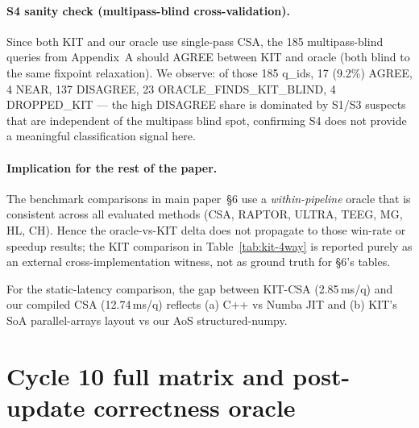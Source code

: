 \documentclass[letterpaper]{article}
\begin{document}
\paragraph{S4 sanity check (multipass-blind cross-validation).}
Since both KIT and our oracle use single-pass CSA, the 185 multipass-blind
queries from Appendix~A should AGREE between KIT and oracle (both blind to
the same fixpoint relaxation). We observe: of those 185 q\_ids,
17 (9.2\%) AGREE, 4 NEAR, 137 DISAGREE, 23 ORACLE\_FINDS\_KIT\_BLIND,
4 DROPPED\_KIT --- the high DISAGREE share is dominated by S1/S3
suspects that are independent of the multipass blind spot, confirming
S4 does not provide a meaningful classification signal here.

\paragraph{Implication for the rest of the paper.} The benchmark
comparisons in main paper~\S6 use a \emph{within-pipeline} oracle that
is consistent across all evaluated methods (CSA, RAPTOR, ULTRA, TEEG,
MG, HL, CH). Hence the oracle-vs-KIT delta does not propagate to those
win-rate or speedup results; the KIT comparison in
Table~\ref{tab:kit-4way} is reported purely as an external
cross-implementation witness, not as ground truth for §6's tables.

For the static-latency comparison, the gap between KIT-CSA
(2.85\,ms/q) and our compiled CSA (12.74\,ms/q) reflects (a) C++ vs
Numba JIT and (b) KIT's SoA parallel-arrays layout vs our AoS
structured-numpy.

\section{Cycle 10 full matrix and post-update correctness oracle}
\label{app:cycle10}
\end{document}
